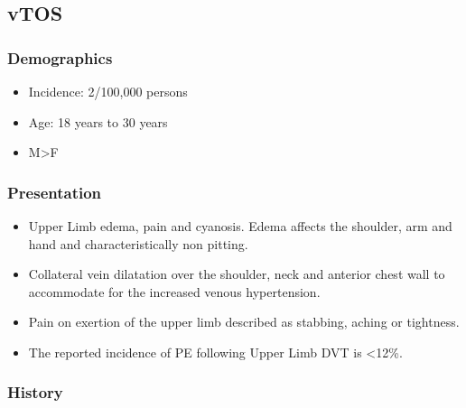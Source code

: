 \documentclass[
]{book}
\begin{document}
\hypertarget{vtos}{%
\subsection{vTOS}\label{vtos}}

\hypertarget{demographics}{%
\subsubsection{Demographics}\label{demographics}}

\begin{itemize}
\item
  Incidence: 2/100,000 persons
\item
  Age: 18 years to 30 years
  \citep{illigComprehensiveReviewPagetSchroetter2010}
\item
  M\textgreater F
\end{itemize}

\hypertarget{presentation}{%
\subsubsection{Presentation}\label{presentation}}

\begin{itemize}
\item
  Upper Limb edema, pain and cyanosis. Edema affects the shoulder, arm
  and hand and characteristically non pitting.
\item
  Collateral vein dilatation over the shoulder, neck and anterior
  chest wall to accommodate for the increased venous hypertension.
  \citep{humphries123ThoracicOutlet2019}
\item
  Pain on exertion of the upper limb described as stabbing, aching or
  tightness.
\item
  The reported incidence of PE following Upper Limb DVT is \textless12\%.
  \citep{humphries123ThoracicOutlet2019}
\end{itemize}

\hypertarget{history}{%
\subsubsection{History}\label{history}}
\end{document}
